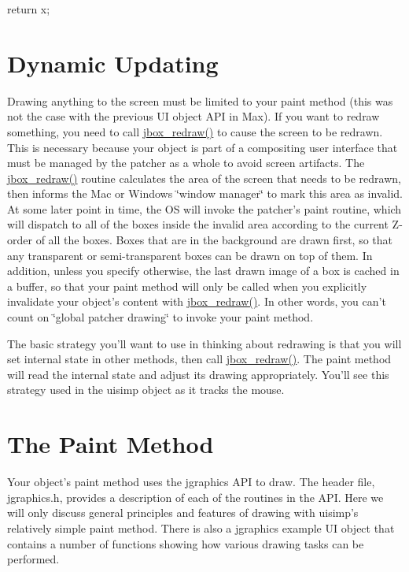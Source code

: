 \begin{DoxyCode}
    return x;
\end{DoxyCode}
\hypertarget{chapter_ui_anatomy_chapter_ui_anatomy_updating}{}\section{Dynamic Updating}\label{chapter_ui_anatomy_chapter_ui_anatomy_updating}
Drawing anything to the screen must be limited to your paint method (this was not the case with the previous UI object API in Max). If you want to redraw something, you need to call \hyperlink{group__jbox_ga92b553f8adc9994553590bbbcfd7e49d}{jbox\_\-redraw()} to cause the screen to be redrawn. This is necessary because your object is part of a compositing user interface that must be managed by the patcher as a whole to avoid screen artifacts. The \hyperlink{group__jbox_ga92b553f8adc9994553590bbbcfd7e49d}{jbox\_\-redraw()} routine calculates the area of the screen that needs to be redrawn, then informs the Mac or Windows \char`\"{}window manager\char`\"{} to mark this area as invalid. At some later point in time, the OS will invoke the patcher's paint routine, which will dispatch to all of the boxes inside the invalid area according to the current Z-\/order of all the boxes. Boxes that are in the background are drawn first, so that any transparent or semi-\/transparent boxes can be drawn on top of them. In addition, unless you specify otherwise, the last drawn image of a box is cached in a buffer, so that your paint method will only be called when you explicitly invalidate your object's content with \hyperlink{group__jbox_ga92b553f8adc9994553590bbbcfd7e49d}{jbox\_\-redraw()}. In other words, you can't count on \char`\"{}global patcher drawing\char`\"{} to invoke your paint method.

The basic strategy you'll want to use in thinking about redrawing is that you will set internal state in other methods, then call \hyperlink{group__jbox_ga92b553f8adc9994553590bbbcfd7e49d}{jbox\_\-redraw()}. The paint method will read the internal state and adjust its drawing appropriately. You'll see this strategy used in the uisimp object as it tracks the mouse.\hypertarget{chapter_ui_anatomy_chapter_ui_anatomy_paint}{}\section{The Paint Method}\label{chapter_ui_anatomy_chapter_ui_anatomy_paint}
Your object's paint method uses the jgraphics API to draw. The header file, jgraphics.h, provides a description of each of the routines in the API. Here we will only discuss general principles and features of drawing with uisimp's relatively simple paint method. There is also a jgraphics example UI object that contains a number of functions showing how various drawing tasks can be performed.

